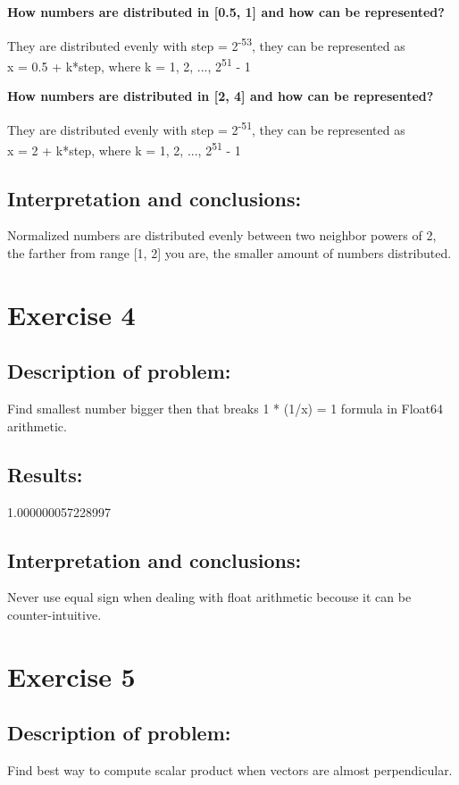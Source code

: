 \documentclass{article}
\begin{document}
\begin{center}
    \textbf{How numbers are distributed in [0.5, 1] and how can be represented?}
\end{center}
They are distributed evenly with step = 2\textsuperscript{-53}, they can be represented as\\
x = 0.5 + k*step, where k = 1, 2, ..., 2\textsuperscript{51} - 1

\begin{center}
    \textbf{How numbers are distributed in [2, 4] and how can be represented?}
\end{center}
They are distributed evenly with step = 2\textsuperscript{-51}, they can be represented as\\
x = 2 + k*step, where k = 1, 2, ..., 2\textsuperscript{51} - 1

\subsection*{Interpretation and conclusions:}
Normalized numbers are distributed evenly between two neighbor powers of 2, the farther from range [1, 2] you are, the smaller amount of numbers distributed.

\section*{Exercise 4}
\subsection*{Description of problem:}
Find smallest number bigger then that breaks 1 * (1/x) = 1 formula in Float64 arithmetic.

\subsection*{Results:}
1.000000057228997

\subsection*{Interpretation and conclusions:}
Never use equal sign when dealing with float arithmetic becouse it can be counter-intuitive.

\section*{Exercise 5}
\subsection*{Description of problem:}
Find best way to compute scalar product when vectors are almost perpendicular.
\end{document}
